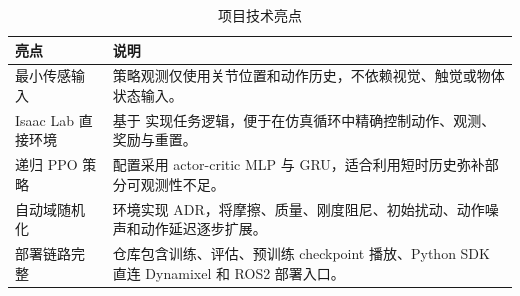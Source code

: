 \begin{table}[H]
\centering
\caption{项目技术亮点}
\begin{tabularx}{\textwidth}{p{}Y}
\toprule
亮点 & 说明 \\
\midrule
最小传感输入 & 策略观测仅使用关节位置和动作历史，不依赖视觉、触觉或物体状态输入。\\
Isaac Lab 直接环境 & 基于  实现任务逻辑，便于在仿真循环中精确控制动作、观测、奖励与重置。\\
递归 PPO 策略 &  配置采用 actor-critic MLP 与 GRU，适合利用短时历史弥补部分可观测性不足。\\
自动域随机化 & 环境实现 ADR，将摩擦、质量、刚度阻尼、初始扰动、动作噪声和动作延迟逐步扩展。\\
部署链路完整 & 仓库包含训练、评估、预训练 checkpoint 播放、Python SDK 直连 Dynamixel 和 ROS2 部署入口。\\
\bottomrule
\end{tabularx}
\end{table}